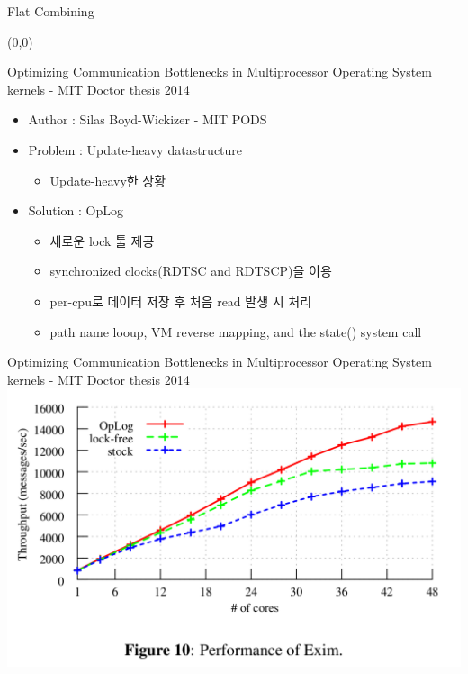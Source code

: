 \documentclass[english]{beamer} %
\begin{document}
\begin{frame}{Flat Combining}
\begin{textblock}{1}(0,0)
\end{textblock}
\end{frame}


\begin{frame}{Optimizing Communication Bottlenecks in Multiprocessor Operating
System kernels - MIT Doctor thesis 2014 }
    \begin{itemize}
    \item Author : Silas Boyd-Wickizer - MIT PODS
    \item Problem : Update-heavy datastructure
        \begin{itemize}
        \item Update-heavy한 상황
        \end{itemize}
    \item Solution : OpLog
        \begin{itemize}
        \item 새로운 lock 툴 제공
        \item synchronized clocks(RDTSC and RDTSCP)을 이용
        \item per-cpu로 데이터 저장 후 처음 read 발생 시 처리 
        \item path name looup, VM reverse mapping, and the state() system call
        \end{itemize}
    \end{itemize}
\end{frame}

\begin{frame}{Optimizing Communication Bottlenecks in Multiprocessor Operating
System kernels - MIT Doctor thesis 2014 }
\includegraphics[width=\textwidth,height=0.7\textheight,
keepaspectratio]{oplog}
\end{frame}
\end{document}
